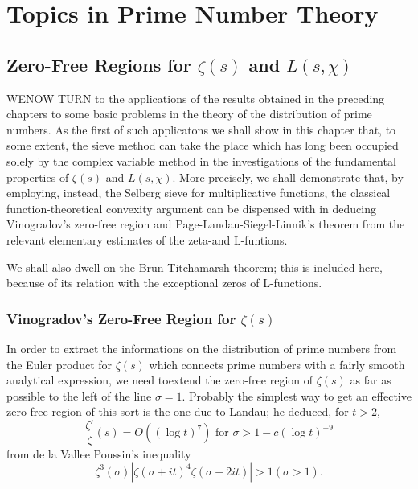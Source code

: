 \part{Topics in Prime Number Theory}\label{part2}

\chapter{Zero-Free Regions for $\zeta (s)$ and $L(s, \chi)$}\label{chap4}

WE\pageoriginale NOW TURN to the applications of the results obtained in the
preceding chapters to some basic problems in the theory of the
distribution of prime numbers. As the first of such applicatons we
shall show in this chapter that, to some extent, the sieve method can
take the place which has long been occupied solely by the complex
variable method in the investigations of the fundamental properties of
$\zeta (s)$ and $L (s, \chi)$. More precisely, we shall demonstrate
that, by employing, instead, the Selberg sieve for multiplicative
functions, the classical function-theoretical convexity argument can
be dispensed with in deducing Vinogradov's zero-free region and
Page-Landau-Siegel-Linnik's theorem from the relevant elementary
estimates of the zeta-and L-funtions. 

We shall     also dwell on the Brun-Titchamarsh theorem; this is
included here, because of its relation with the exceptional zeros of
L-functions. 

\section{Vinogradov's Zero-Free Region for $\zeta
  (s)$}\label{chap4-sec4.1} %

In order to extract the informations on the distribution of prime
numbers from the Euler product for $\zeta (s)$ which connects prime
numbers with a fairly smooth analytical expression, we need
to\pageoriginale extend 
the zero-free region of $\zeta (s)$ as far as possible to the left of
the line $\sigma = 1$. Probably the simplest way to get an effective
zero-free region of this sort is the one due to Landau; he deduced,
for $t > 2$, 
\begin{equation*}
  \frac{\zeta '}{\zeta} (s) = O((\log t)^7) \text{ for } \sigma > 1 - c
  (\log t)^{-9} \tag{4.1.1} \label{eq4.1.1}
\end{equation*}
from de la Vallee Poussin's inequality 
\begin{equation*}
  \zeta^3 (\sigma ) | \zeta (\sigma + it)^4 \zeta (\sigma + 2 it) | >
  1 (\sigma > 1). \tag{4.1.2} \label{eq4.1.2}
\end{equation*}

